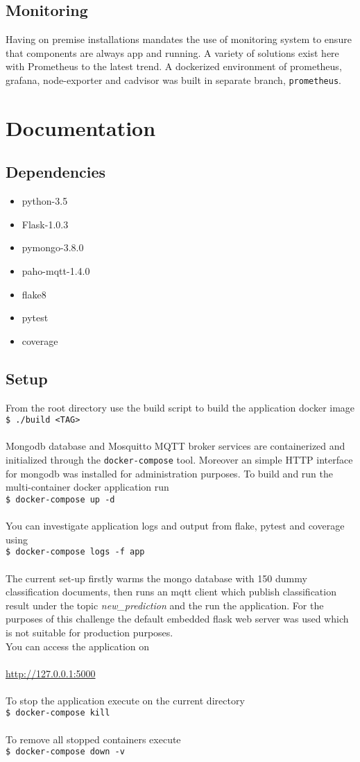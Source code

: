\documentclass[a4paper,10pt]{article}
\newcommand{\shellcmd}[1]{\\\indent\indent\texttt{\footnotesize\$ #1}\\}
\begin{document}
\subsection{Monitoring}
Having on premise installations mandates the use of monitoring system to ensure that components are always app and running.
A variety of solutions exist here with Prometheus to the latest trend. A dockerized environment of prometheus, grafana,
node-exporter and cadvisor was built in separate branch, \texttt{prometheus}.

\section{Documentation}

\subsection{Dependencies}
\begin{itemize}
 \item python-3.5
 \item Flask-1.0.3
 \item pymongo-3.8.0
 \item paho-mqtt-1.4.0
 \item flake8
 \item pytest
 \item coverage
\end{itemize}

\subsection{Setup}
From the root directory use the build script to build the application docker image
\shellcmd{./build <TAG>}
\\
Mongodb database and Mosquitto MQTT broker services are containerized and initialized through the
\texttt{docker-compose} tool. Moreover an simple HTTP interface for mongodb was installed
for administration purposes. To build and run the multi-container docker application run
\shellcmd{docker-compose up -d}
\\
You can investigate application logs and output from flake, pytest and coverage using
\shellcmd{docker-compose logs -f app}
\\
The current set-up firstly warms the mongo database with 150 dummy classification documents,
then runs an mqtt client which publish classification result under the topic \emph{new\_prediction}
and the run the application. For the purposes of this challenge the default embedded flask web server
was used which is not suitable for production purposes.
\\
You can access the application on \\
\\
\hspace*{50pt}\url{http://127.0.0.1:5000}\\
\\
To stop the application execute on the current directory
\shellcmd{docker-compose kill}
\\
To remove all stopped containers execute
\shellcmd{docker-compose down -v}
\end{document}

